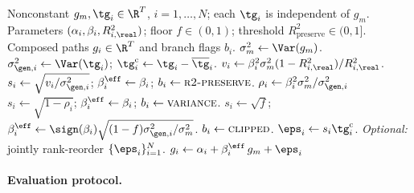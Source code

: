 \begin{algorithm}[t]
\caption{Hybrid single-index model (SIM) composition with variance correction.}
\label{alg:hybrid}
\small
\begin{algorithmic}[1]
  \REQUIRE Nonconstant $g_m,\tg_i\in\R^T$, $i=1,\dots,N$; each
    $\tg_i$ is independent of $g_m$.
  \REQUIRE Parameters $(\alpha_i,\beta_i,R^2_{i,\real})$; floor
    $f\in(0,1)$; threshold $R^2_{\mathrm{preserve}}\in(0,1]$.
  \ENSURE Composed paths $g_i\in\R^T$ and branch flags $b_i$.
  \STATE $\sigma_m^2 \gets \Var(g_m)$.
    \STATE $\sigma_{\gen,i}^2 \gets \Var(\tg_i)$;
      $\tg_i^{\mathrm c} \gets \tg_i-\overline{\tg}_i$.
      \STATE $v_i \gets \beta_i^2\sigma_m^2(1-R^2_{i,\real})/R^2_{i,\real}$.
      \STATE $s_i \gets \sqrt{v_i/\sigma_{\gen,i}^2}$;
        $\beta_i^{\eff} \gets \beta_i$; $b_i\gets\textsc{r2-preserve}$.
    \ELSE
      \STATE $\rho_i \gets \beta_i^2 \sigma_m^2 / \sigma_{\gen,i}^2$
        \STATE $s_i \gets \sqrt{1-\rho_i}$;
          $\beta_i^{\eff}\gets\beta_i$; $b_i\gets\textsc{variance}$.
      \ELSE
        \STATE $s_i\gets\sqrt{f}$;
          $\beta_i^{\eff}\gets\sign(\beta_i)
          \sqrt{(1-f)\sigma_{\gen,i}^2/\sigma_m^2}$.
        \STATE $b_i\gets\textsc{clipped}$.
      \ENDIF
    \ENDIF
    \STATE $\eps_i \gets s_i\tg_i^{\mathrm c}$.
  \ENDFOR
  \STATE \textit{Optional:} jointly rank-reorder $\{\eps_i\}_{i=1}^{N}$.
    \STATE $g_i \gets \alpha_i + \beta_i^{\eff}\, g_m + \eps_i$
      \hfill {}
  \ENDFOR
\end{algorithmic}
\end{algorithm}

\FloatBarrier

\paragraph{Evaluation protocol.}

